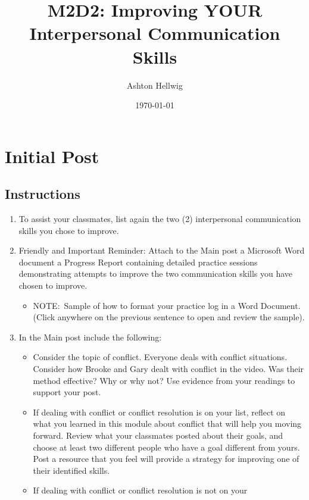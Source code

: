 \documentclass[stu,12pt]{apa7}
\title{%
    M2D2: Improving YOUR Interpersonal Communication Skills
  }
\author{Ashton Hellwig}
\date{\today}
\begin{document}
  \maketitle

  \section{Initial Post}
    \subsection*{Instructions}
      \begin{enumerate}
        \item To assist your classmates, list again the two (2) interpersonal
          communication skills you chose to improve.
        \item Friendly and Important Reminder: Attach to the Main post a
          Microsoft Word document a Progress Report containing detailed practice
          sessions demonstrating attempts to improve the two communication
          skills you have chosen to improve.
          \begin{itemize}
            \item NOTE:\ Sample of how to format your practice log in a Word
              Document. (Click anywhere on the previous sentence to open and
              review the sample).
          \end{itemize}
        \item In the Main post include the following:
          \begin{itemize}
            \item Consider the topic of conflict. Everyone deals with conflict
              situations. Consider how Brooke and Gary dealt with conflict in
              the video. Was their method effective? Why or why not? Use
              evidence from your readings to support your post.
            \item If dealing with conflict or conflict resolution is on your
              list, reflect on what you learned in this module about conflict
              that will help you moving forward. Review what your classmates
              posted about their goals, and choose at least two different people
              who have a goal different from yours. Post a resource that you
              feel will provide a strategy for improving one of their identified
              skills.
            \item If dealing with conflict or conflict resolution is not on your

\end{itemize}
\end{enumerate}
\end{document}
